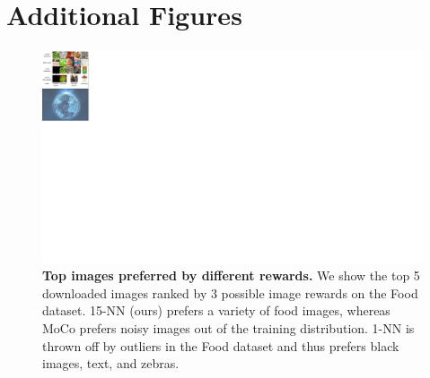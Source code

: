 
\section{Additional Figures}
\begin{figure}
    \centering
    \includegraphics[width=0.5\linewidth]{figures/reward_ranking.pdf}
    \caption{\textbf{Top images preferred by different rewards.} We show the top 5 downloaded images ranked by 3 possible image rewards on the Food dataset. 15-NN (ours) prefers a variety of food images, whereas MoCo prefers noisy images out of the training distribution. 1-NN is thrown off by outliers in the Food dataset and thus prefers black images, text, and zebras.}
    \label{fig:reward_ranking}
\end{figure}

